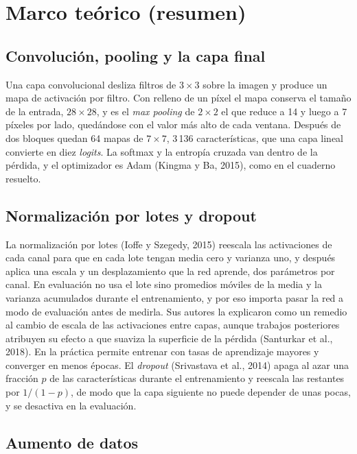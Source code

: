 \documentclass[11pt,letterpaper]{article}
\begin{document}
\section{Marco teórico (resumen)}

\subsection{Convolución, pooling y la capa final}

Una capa convolucional desliza filtros de $3\times3$ sobre la imagen y produce un mapa de activación por filtro. Con relleno de un píxel el mapa conserva el tamaño de la entrada, $28\times28$, y es el \emph{max pooling} de $2\times2$ el que reduce a 14 y luego a 7 píxeles por lado, quedándose con el valor más alto de cada ventana. Después de dos bloques quedan 64 mapas de $7\times7$, 3\,136 características, que una capa lineal convierte en diez \emph{logits}. La softmax y la entropía cruzada van dentro de la pérdida, y el optimizador es Adam (Kingma y Ba, 2015), como en el cuaderno resuelto.

\subsection{Normalización por lotes y dropout}

La normalización por lotes (Ioffe y Szegedy, 2015) reescala las activaciones de cada canal para que en cada lote tengan media cero y varianza uno, y después aplica una escala y un desplazamiento que la red aprende, dos parámetros por canal. En evaluación no usa el lote sino promedios móviles de la media y la varianza acumulados durante el entrenamiento, y por eso importa pasar la red a modo de evaluación antes de medirla. Sus autores la explicaron como un remedio al cambio de escala de las activaciones entre capas, aunque trabajos posteriores atribuyen su efecto a que suaviza la superficie de la pérdida (Santurkar et al., 2018). En la práctica permite entrenar con tasas de aprendizaje mayores y converger en menos épocas. El \emph{dropout} (Srivastava et al., 2014) apaga al azar una fracción $p$ de las características durante el entrenamiento y reescala las restantes por $1/(1-p)$, de modo que la capa siguiente no puede depender de unas pocas, y se desactiva en la evaluación.

\subsection{Aumento de datos}
\end{document}
